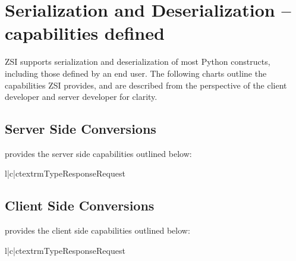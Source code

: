 \chapter{Serialization and Deserialization -- capabilities defined}

ZSI supports serialization and deserialization of most Python constructs,
including those defined by an end user.  The following charts outline the
capabilities ZSI provides, and are described from the perspective of the
client developer and server developer for clarity.

\section{Server Side Conversions}
 provides the server side capabilities outlined below:

\begin{tableiii}{l|c|c}{textrm}{Type}{Response}{Request}
\end{tableiii}


\section{Client Side Conversions}
 provides the client side capabilities outlined below:

\begin{tableiii}{l|c|c}{textrm}{Type}{Response}{Request}
\end{tableiii}

